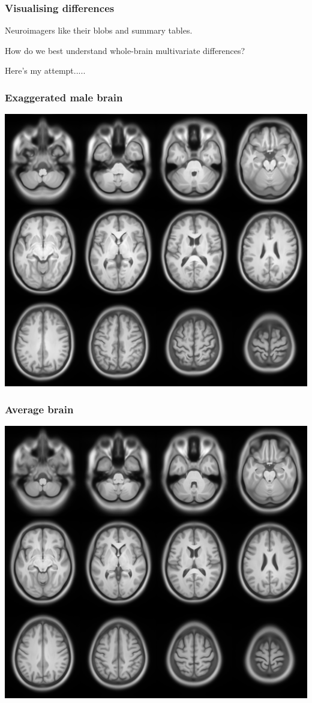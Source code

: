 \begin{frame}
\frametitle{Visualising differences}
Neuroimagers like their blobs and summary tables.

How do we best understand whole-brain multivariate differences?

Here's my attempt.....
\end{frame}


\begin{frame}
\frametitle{Exaggerated male brain}
\begin{center}
\includegraphics[width=.7\textwidth]{hyper_male}
\end{center}
\end{frame}



\begin{frame}
\frametitle{Average brain}
\begin{center}
\includegraphics[width=.7\textwidth]{avgT1}
\end{center}
\end{frame}



